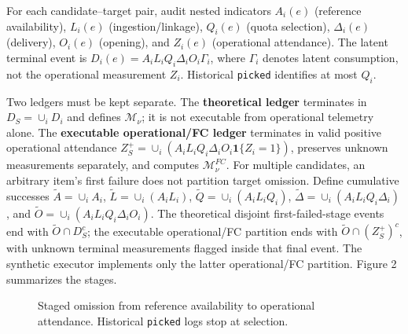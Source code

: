\documentclass[
  11pt]{article}
\begin{document}
For each candidate--target pair, audit nested indicators \(A_i(e)\)
(reference availability), \(L_i(e)\) (ingestion/linkage), \(Q_i(e)\)
(quota selection), \(\Delta_i(e)\) (delivery), \(O_i(e)\) (opening), and
\(Z_i(e)\) (operational attendance). The latent terminal event is
\(D_i(e)=A_iL_iQ_i\Delta_iO_i\Gamma_i\), where \(\Gamma_i\) denotes
latent consumption, not the operational measurement \(Z_i\). Historical
\texttt{picked} identifies at most \(Q_i\).

Two ledgers must be kept separate. The \textbf{theoretical ledger}
terminates in \(D_S=\cup_iD_i\) and defines \(\mathcal M_\nu\); it is
not executable from operational telemetry alone. The \textbf{executable
operational/FC ledger} terminates in valid positive operational
attendance \(Z_S^+=\cup_i(A_iL_iQ_i\Delta_iO_i\mathbf1\{Z_i=1\})\),
preserves unknown measurements separately, and computes
\(\mathcal M_\nu^{FC}\). For multiple candidates, an arbitrary item's
first failure does not partition target omission. Define cumulative
successes \(\widetilde A=\cup_iA_i\), \(\widetilde L=\cup_i(A_iL_i)\),
\(\widetilde Q=\cup_i(A_iL_iQ_i)\),
\(\widetilde\Delta=\cup_i(A_iL_iQ_i\Delta_i)\), and
\(\widetilde O=\cup_i(A_iL_iQ_i\Delta_iO_i)\). The theoretical disjoint
first-failed-stage events end with \(\widetilde O\cap D_S^c\); the
executable operational/FC partition ends with
\(\widetilde O\cap (Z_S^+)^c\), with unknown terminal measurements
flagged inside that final event. The synthetic executor implements only
the latter operational/FC partition. Figure 2 summarizes the stages.

\begin{figure}[htbp]
\centering
{}
\caption{Staged omission from reference availability to operational attendance. Historical \texttt{picked} logs stop at selection.}
\label{fig:omission-stages}
\end{figure}
\end{document}
